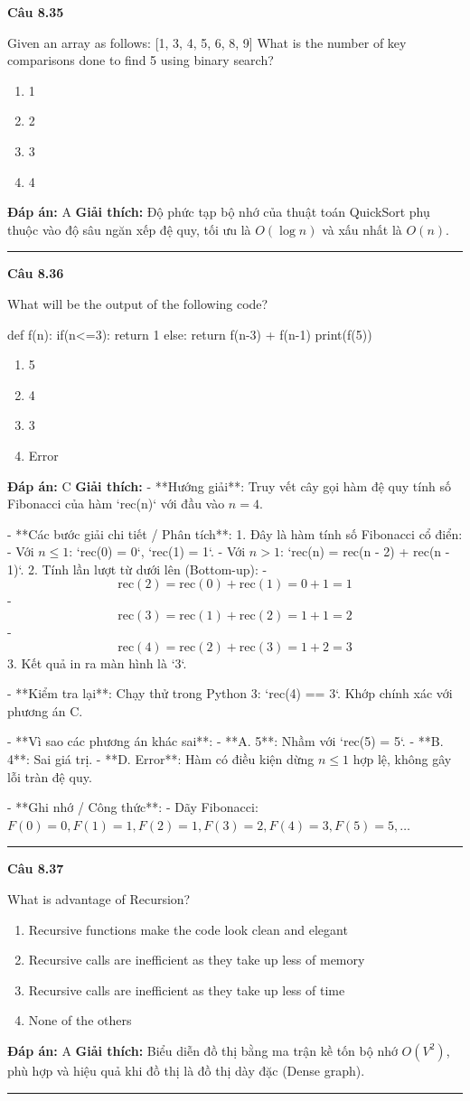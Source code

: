 \documentclass[11pt,a4paper]{article}
\newenvironment{question}[1]{%
  \par\vspace{1em}\noindent\textbf{\large Câu #1}\par\vspace{0.4em}
}{%
  \par\vspace{1em}\hrule\vspace{0.6em}
}
\newenvironment{choices}{%
  \begin{enumerate}[label=\textbf{\Alph*.},leftmargin=2.2em,itemsep=2pt,topsep=3pt]
}{%
  \end{enumerate}
}
\newcommand{\choice}{\item}
\newenvironment{codebox}{%
  \begin{tcolorbox}[colback=gray!8!white,colframe=gray!50!black,arc=1.5mm,boxrule=0.6pt,left=3mm,right=3mm,top=2.5mm,bottom=2.5mm]
  \ttfamily\small
}{%
  \end{tcolorbox}
}
\begin{document}
\begin{question}{8.35}
Given an array as follows: [1, 3, 4, 5, 6, 8, 9] What is the number of key comparisons done to find 5 using binary search?
\begin{choices}
\choice 1
\choice 2
\choice 3
\choice 4
\end{choices}
\textbf{Đáp án:} A
\textbf{Giải thích:} Độ phức tạp bộ nhớ của thuật toán QuickSort phụ thuộc vào độ sâu ngăn xếp đệ quy, tối ưu là \(O(\log n)\) và xấu nhất là \(O(n)\).
\end{question}

\begin{question}{8.36}
What will be the output of the following code?
\begin{codebox}
def f(n):
    if(n<=3):
        return 1
    else:
        return f(n-3) + f(n-1)
print(f(5))
\end{codebox}
\begin{choices}
\choice 5
\choice 4
\choice 3
\choice Error
\end{choices}
\textbf{Đáp án:} C
\textbf{Giải thích:} - **Hướng giải**:
  Truy vết cây gọi hàm đệ quy tính số Fibonacci của hàm `rec(n)` với đầu vào \(n = 4\).

- **Các bước giải chi tiết / Phân tích**:
  1. Đây là hàm tính số Fibonacci cổ điển:
     - Với \(n \le 1\): `rec(0) = 0`, `rec(1) = 1`.
     - Với \(n > 1\): `rec(n) = rec(n - 2) + rec(n - 1)`.
  2. Tính lần lượt từ dưới lên (Bottom-up):
     - \[ \text{rec}(2) = \text{rec}(0) + \text{rec}(1) = 0 + 1 = 1 \]
     - \[ \text{rec}(3) = \text{rec}(1) + \text{rec}(2) = 1 + 1 = 2 \]
     - \[ \text{rec}(4) = \text{rec}(2) + \text{rec}(3) = 1 + 2 = 3 \]
  3. Kết quả in ra màn hình là `3`.

- **Kiểm tra lại**:
  Chạy thử trong Python 3:
  `rec(4) == 3`.
  Khớp chính xác với phương án C.

- **Vì sao các phương án khác sai**:
  - **A. 5**: Nhầm với `rec(5) = 5`.
  - **B. 4**: Sai giá trị.
  - **D. Error**: Hàm có điều kiện dừng \(n \le 1\) hợp lệ, không gây lỗi tràn đệ quy.

- **Ghi nhớ / Công thức**:
  - Dãy Fibonacci: \(F(0)=0, F(1)=1, F(2)=1, F(3)=2, F(4)=3, F(5)=5, \dots\)
\end{question}

\begin{question}{8.37}
What is advantage of Recursion?
\begin{choices}
\choice Recursive functions make the code look clean and elegant
\choice Recursive calls are inefficient as they take up less of memory
\choice Recursive calls are inefficient as they take up less of time
\choice None of the others
\end{choices}
\textbf{Đáp án:} A
\textbf{Giải thích:} Biểu diễn đồ thị bằng ma trận kề tốn bộ nhớ \(O(V^2)\), phù hợp và hiệu quả khi đồ thị là đồ thị dày đặc (Dense graph).
\end{question}
\end{document}
